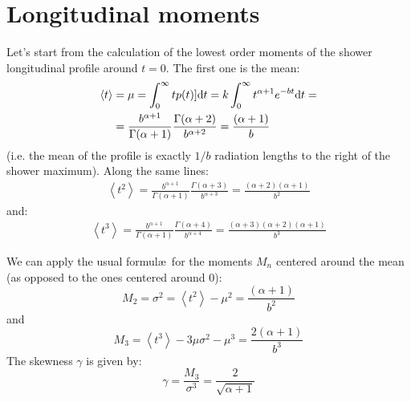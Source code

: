 \documentclass[a4paper,11pt]{article}
\newcommand{\diff}{{\rm d}}
\begin{document}
\section{Longitudinal moments}

Let's start from the calculation of the lowest order moments of the shower
longitudinal profile around $t=0$. The first one is the mean:
\begin{align}
\left< t \right> &= \mu = \int_{0}^\infty t p(t) ] \diff t =
k \int_{0}^\infty t^{\alpha + 1} e^{-bt} \diff t =\nonumber\\
&= \frac{b^{\alpha + 1}}{\Gamma(\alpha + 1)}
\frac{\Gamma(\alpha + 2)}{b^{\alpha + 2}} = \frac{(\alpha + 1)}{b}
\end{align}
(i.e. the mean of the profile is exactly $1/b$ radiation lengths to the
right of the shower maximum). Along the same lines:
\begin{align}
\left< t^2 \right> = \frac{b^{\alpha + 1}}{\Gamma(\alpha + 1)}
\frac{\Gamma(\alpha + 3)}{b^{\alpha + 3}} =
\frac{(\alpha + 2)(\alpha + 1)}{b^2}
\end{align}
and:
\begin{align}
\left< t^3 \right> = \frac{b^{\alpha + 1}}{\Gamma(\alpha + 1)}
\frac{\Gamma(\alpha + 4)}{b^{\alpha + 4}} =
\frac{(\alpha + 3)(\alpha + 2)(\alpha + 1)}{b^3}
\end{align}

We can apply the usual formul\ae\ for the moments $M_n$ centered around the
mean (as opposed to the ones centered around 0):
\begin{equation}
M_2 = \sigma^2 = \left< t^2 \right> - \mu^2 =
\frac{(\alpha + 1)}{b^2}
\end{equation}
and
\begin{equation}
M_3 = \left< t^3 \right> - 3\mu\sigma^2 - \mu^3 = \frac{2(\alpha + 1)}{b^3}
\end{equation}
The skewness $\gamma$ is given by:
\begin{equation}
\gamma = \frac{M_3}{\sigma^3} = \frac{2}{\sqrt{\alpha + 1}}
\end{equation}
\end{document}
